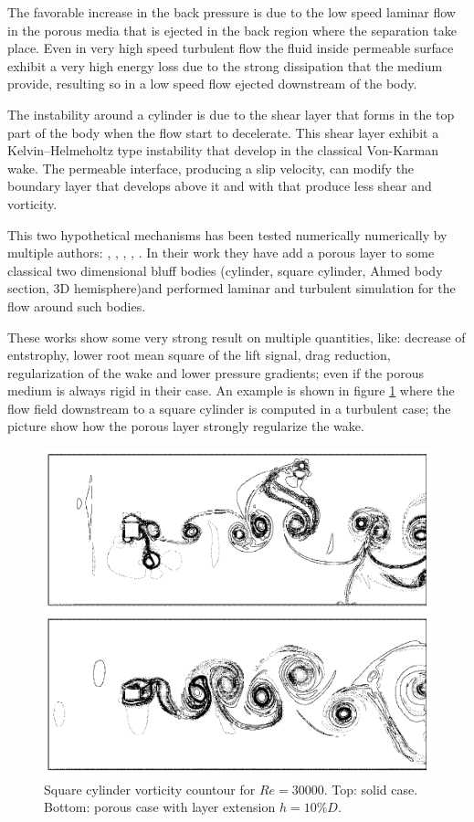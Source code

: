 The favorable increase in the back pressure is due to the low speed laminar flow in the porous media that is ejected in the back region where the separation take place.
Even in very high speed turbulent flow the fluid inside permeable surface exhibit a very high energy loss due to the strong dissipation that the medium provide, resulting so in a low speed flow ejected downstream of the body.

The instability around a cylinder is due to the shear layer that forms in the top part of the body when the flow start to decelerate.
This shear layer exhibit a Kelvin–Helmeholtz type instability that develop in the classical Von-Karman wake.
The permeable interface, producing a slip velocity, can modify the boundary layer that develops above it and with that produce less shear and vorticity.

This two hypothetical mechanisms has been tested numerically numerically by multiple authors: \citet{bruneau2004passive}, \citet{bruneau2008numerical}, \citet{bhattacharyya2011reduction}, \citet{naito2012numerical}, \citet{mimeau2017passive}.
In their work they have add a porous layer to some classical two dimensional bluff bodies (cylinder, square cylinder, Ahmed body section, 3D hemisphere)and performed laminar and turbulent simulation for the flow around such bodies.

These works show some very strong result on multiple quantities, like: decrease of entstrophy, lower root mean square of the lift signal, drag reduction, regularization of the wake and lower pressure gradients; even if the porous medium is always rigid in their case.
An example is shown in figure \ref{fig:porous_cylinder} where the flow field downstream to a square cylinder is computed in a turbulent case; the picture show how the porous layer strongly regularize the wake.

\begin{figure}[h]
	\centering
	\includegraphics[width=0.7\linewidth]{chapter_1/cylinder_porous}
	\caption{Square cylinder vorticity countour for $Re=30000$. Top: solid case. Bottom: porous case with layer extension $h=10\% D$.}
	\label{fig:porous_cylinder}
\end{figure}


